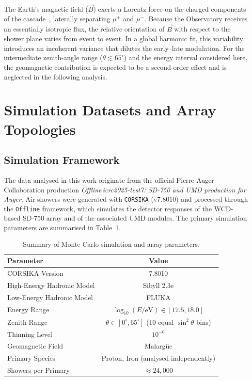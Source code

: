 \documentclass[11pt,a4paper]{article}
\begin{document}
The Earth's magnetic field ($\vec{B}$) exerts a Lorentz force on the charged components of the cascade~\cite{Scornavacche2026,collaboration_2014}, laterally separating $\mu^{+}$ and $\mu^{-}$. Because the Observatory receives an essentially isotropic flux, the relative orientation of $\vec{B}$ with respect to the shower plane varies from event to event. In a global harmonic fit, this variability introduces an incoherent variance that dilutes the early--late modulation. For the intermediate zenith-angle range ($\theta \lesssim 65^{\circ}$) and the energy interval considered here, the geomagnetic contribution is expected to be a second-order effect and is neglected in the following analysis.

\section{Simulation Datasets and Array Topologies}
\label{sec:methodology}

\subsection{Simulation Framework}
\label{subsec:framework}

The data analysed in this work originate from the official Pierre Auger Collaboration production \textit{Offline\,icrc2025-test7: SD-750 and UMD production for Auger}. Air showers were generated with \texttt{CORSIKA} (v7.8010) \cite{heck1998} and processed through the \texttt{Offline} framework, which simulates the detector responses of the WCD-based SD-750 array and of the associated UMD modules. The primary simulation parameters are summarised in Table~\ref{tab:mc_params}.

\begin{table}[h]
\centering
\caption{Summary of Monte Carlo simulation and array parameters.}
\label{tab:mc_params}
\begin{tabularx}{0.8\textwidth}{X c}
\toprule
\textbf{Parameter} & \textbf{Value} \\
\midrule
CORSIKA Version & 7.8010 \\
High-Energy Hadronic Model & Sibyll 2.3e \cite{riehn2020} \\
Low-Energy Hadronic Model & FLUKA \\
Energy Range & $\log_{10}(E/\text{eV}) \in [17.5, 18.0]$ \\
Zenith Range & $\theta \in [0^\circ, 65^\circ]$ (10 equal $\sin^2\theta$ bins) \\
Thinning Level & $10^{-6}$ \\
Geomagnetic Field & Malarg\"ue  \\
Primary Species & Proton, Iron (analysed independently) \\
Showers per Primary & $\approx 24,000$ \\
\bottomrule
\end{tabularx}
\end{table}
\end{document}
